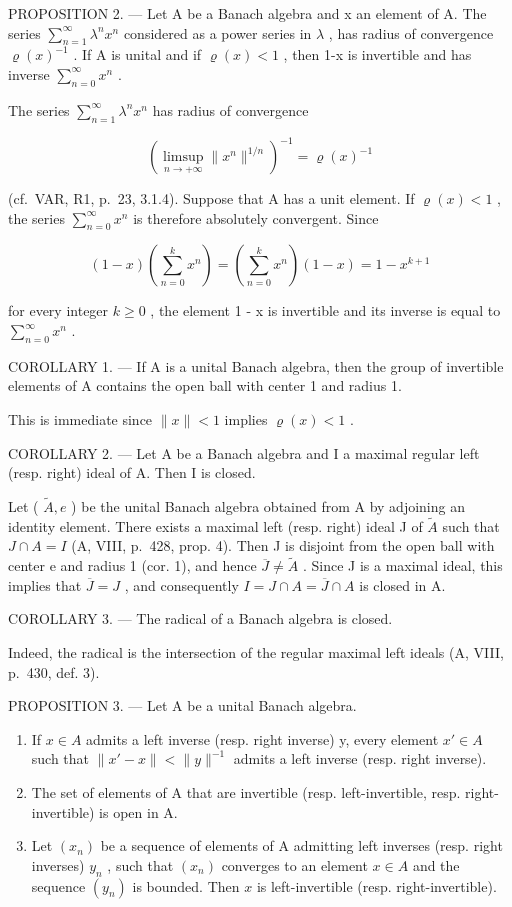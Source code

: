 PROPOSITION 2. --- Let A be a Banach algebra and x an element of A. The series \(\sum_{n=1}^{\infty}\lambda^{n}x^{n}\) considered as a power series in \(\lambda\) , has radius of convergence \(\varrho(x)^{-1}\) . If A is unital and if \(\varrho(x)<1\) , then 1-x is invertible and has inverse \(\sum_{n=0}^{\infty}x^{n}\) .

The series \(\sum_{n=1}^{\infty}\lambda^{n}x^{n}\) has radius of convergence

\[
(\limsup _ {n \to + \infty} \| x ^ {n} \| ^ {1 / n}) ^ {- 1} = \varrho (x) ^ {- 1}
\]

(cf.~VAR, R1, p.~23, 3.1.4). Suppose that A has a unit element. If \(\varrho(x) < 1\) , the series \(\sum_{n=0}^{\infty} x^n\) is therefore absolutely convergent. Since

\[
(1 - x) \left(\sum_ {n = 0} ^ {k} x ^ {n}\right) = \left(\sum_ {n = 0} ^ {k} x ^ {n}\right) (1 - x) = 1 - x ^ {k + 1}
\]

for every integer \(k \geqslant 0\) , the element 1 - x is invertible and its inverse is equal to \(\sum_{n=0}^{\infty} x^{n}\) .

COROLLARY 1. --- If A is a unital Banach algebra, then the group of invertible elements of A contains the open ball with center 1 and radius 1.

This is immediate since \(\|x\| < 1\) implies \(\varrho(x) < 1\) .

COROLLARY 2. --- Let A be a Banach algebra and I a maximal regular left (resp. right) ideal of A. Then I is closed.

Let ( \(\tilde{A}, e\) ) be the unital Banach algebra obtained from A by adjoining an identity element. There exists a maximal left (resp. right) ideal J of \(\tilde{A}\) such that \(J \cap A = I\) (A, VIII, p.~428, prop. 4). Then J is disjoint from the open ball with center e and radius 1 (cor. 1), and hence \(\overline{J} \neq \widetilde{A}\) . Since J is a maximal ideal, this implies that \(\overline{J} = J\) , and consequently \(I = J \cap A = \overline{J} \cap A\) is closed in A.

COROLLARY 3. --- The radical of a Banach algebra is closed.

Indeed, the radical is the intersection of the regular maximal left ideals (A, VIII, p.~430, def. 3).

PROPOSITION 3. --- Let A be a unital Banach algebra.

\begin{enumerate}
\def\labelenumi{\alph{enumi})}
\item
  If \(x \in A\) admits a left inverse (resp. right inverse) y, every element \(x' \in A\) such that \(\|x' - x\| < \|y\|^{-1}\) admits a left inverse (resp. right inverse).
\item
  The set of elements of A that are invertible (resp. left-invertible, resp. right-invertible) is open in A.
\item
  Let \((x_{n})\) be a sequence of elements of A admitting left inverses (resp. right inverses) \(y_{n}\) , such that \((x_{n})\) converges to an element \(x \in A\) and the sequence \((y_{n})\) is bounded. Then \(x\) is left-invertible (resp. right-invertible).
\end{enumerate}

